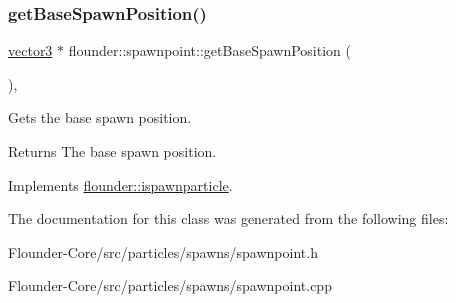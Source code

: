 \subsubsection{\texorpdfstring{get\+Base\+Spawn\+Position()}{getBaseSpawnPosition()}}
{\footnotesize\ttfamily \hyperlink{classflounder_1_1vector3}{vector3} $\ast$ flounder\+::spawnpoint\+::get\+Base\+Spawn\+Position (\begin{DoxyParamCaption}{ }\end{DoxyParamCaption})\hspace{0.3cm}{\ttfamily [override]}, {\ttfamily [virtual]}}



Gets the base spawn position. 

\begin{DoxyReturn}{Returns}
The base spawn position. 
\end{DoxyReturn}


Implements \hyperlink{classflounder_1_1ispawnparticle_a3e59019906bbb5ba8df82a4f6e847ef6}{flounder\+::ispawnparticle}.



The documentation for this class was generated from the following files\+:\begin{DoxyCompactItemize}
\item 
Flounder-\/\+Core/src/particles/spawns/spawnpoint.\+h\item 
Flounder-\/\+Core/src/particles/spawns/spawnpoint.\+cpp\end{DoxyCompactItemize}
